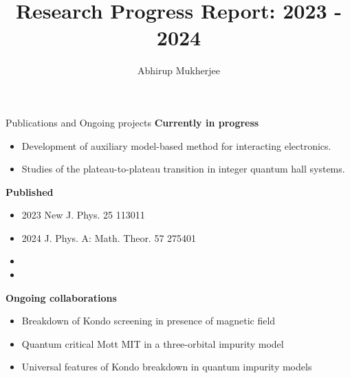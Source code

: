 \documentclass[12pt,aspectratio=169]{beamer}
\title{Research Progress Report: 2023 - 2024}
\author{Abhirup Mukherjee}
\institute{
Department of Physical Sciences,\\
IISER Kolkata, Mohanpur}
\newcommand\focus[1]{%
	{\alert{\textbf{#1}}}
}
\begin{document}
\centering

\begin{frame}
\maketitle
\end{frame}

\begin{frame}{Publications and Ongoing projects}
\focus{Currently in progress}
\begin{itemize}
	\item Development of auxiliary model-based method for interacting electronics.
	\item Studies of the plateau-to-plateau transition in integer quantum hall systems.
\end{itemize}

\vspace*{\fill}

\focus{Published}\\[5pt]

\begin{minipage}{0.49\textwidth}
\begin{itemize}
	\item 2023 New J. Phys. 25 113011
	\item 2024 J. Phys. A: Math. Theor. 57 275401
\end{itemize}
\end{minipage}
\begin{minipage}{0.49\textwidth}
\begin{itemize}
	\item {}
	\item {}
\end{itemize}
\end{minipage}

\vspace*{\fill}

\focus{Ongoing collaborations}

\begin{itemize}
	\item Breakdown of Kondo screening in presence of magnetic field
	\item Quantum critical Mott MIT in a three-orbital impurity model
	\item Universal features of Kondo breakdown in quantum impurity models
\end{itemize}
\end{frame}
\end{document}
